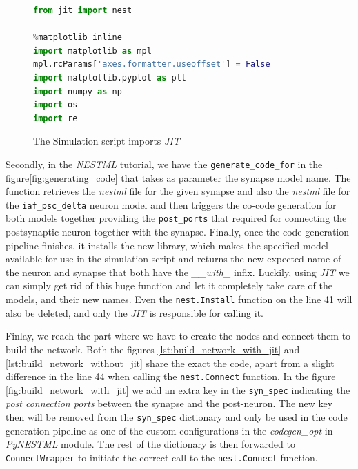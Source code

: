 \begin{figure}[ht!]
\centering
\begin{lstlisting}[language=Python, label=lst:imports_with_jit]
from jit import nest

%matplotlib inline
import matplotlib as mpl
mpl.rcParams['axes.formatter.useoffset'] = False
import matplotlib.pyplot as plt
import numpy as np
import os
import re
\end{lstlisting}
\caption{The Simulation script imports \emph{JIT}}
\end{figure}

Secondly, in the \emph{NESTML} tutorial, we have the \texttt{generate\_code\_for} in the figure\autoref{fig:generating_code} that takes as parameter the synapse model name. The function retrieves the \emph{nestml} file for the given synapse and also the \emph{nestml} file for the \texttt{iaf\_psc\_delta} neuron model and then triggers the co-code generation for both models together providing the \texttt{post\_ports} that required for connecting the postsynaptic neuron together with the synapse. Finally, once the code generation pipeline finishes, it installs the new library, which makes the specified model available for use in the simulation script and returns the new expected name of the neuron and synapse that both have the \emph{\_\_with\_} infix. Luckily, using \emph{JIT} we can simply get rid of this huge function and let it completely take care of the models, and their new names. Even the \texttt{nest.Install} function on the line 41 will also be deleted, and only the \emph{JIT} is responsible for calling it.



Finlay, we reach the part where we have to create the nodes and connect them to build the network. Both the figures \autoref{lst:build_network_with_jit} and \autoref{lst:build_network_without_jit} share the exact the code, apart from a slight difference in the line 44 when calling the \texttt{nest.Connect} function. In the figure \autoref{fig:build_network_with_jit} we add an extra key in the \texttt{syn\_spec} indicating the \emph{post connection ports} between the synapse and the post-neuron. The new key then will be removed from the \texttt{syn\_spec} dictionary and only be used in the code generation pipeline as one of the custom configurations in the \emph{codegen\_opt} in \emph{PyNESTML} module. The rest of the dictionary is then forwarded to \texttt{ConnectWrapper} to initiate the correct call to the \texttt{nest.Connect} function.


